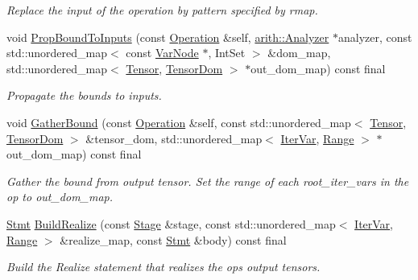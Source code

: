 \begin{DoxyCompactItemize}
\begin{DoxyCompactList}\small\item\em Replace the input of the operation by pattern specified by rmap. \end{DoxyCompactList}\item 
void \hyperlink{classtvm_1_1te_1_1ScanOpNode_a457c2582ccf09454b6c18818297172f7}{Prop\+Bound\+To\+Inputs} (const \hyperlink{classtvm_1_1te_1_1Operation}{Operation} \&self, \hyperlink{classtvm_1_1arith_1_1Analyzer}{arith\+::\+Analyzer} $\ast$analyzer, const std\+::unordered\+\_\+map$<$ const \hyperlink{classtvm_1_1tir_1_1VarNode}{Var\+Node} $\ast$, Int\+Set $>$ \&dom\+\_\+map, std\+::unordered\+\_\+map$<$ \hyperlink{classtvm_1_1te_1_1Tensor}{Tensor}, \hyperlink{structtvm_1_1te_1_1TensorDom}{Tensor\+Dom} $>$ $\ast$out\+\_\+dom\+\_\+map) const final
\begin{DoxyCompactList}\small\item\em Propagate the bounds to inputs. \end{DoxyCompactList}\item 
void \hyperlink{classtvm_1_1te_1_1ScanOpNode_a05f9152abd7511c3a9861a8936cb8e52}{Gather\+Bound} (const \hyperlink{classtvm_1_1te_1_1Operation}{Operation} \&self, const std\+::unordered\+\_\+map$<$ \hyperlink{classtvm_1_1te_1_1Tensor}{Tensor}, \hyperlink{structtvm_1_1te_1_1TensorDom}{Tensor\+Dom} $>$ \&tensor\+\_\+dom, std\+::unordered\+\_\+map$<$ \hyperlink{classtvm_1_1tir_1_1IterVar}{Iter\+Var}, \hyperlink{classtvm_1_1Range}{Range} $>$ $\ast$out\+\_\+dom\+\_\+map) const final
\begin{DoxyCompactList}\small\item\em Gather the bound from output tensor. Set the range of each root\+\_\+iter\+\_\+vars in the op to out\+\_\+dom\+\_\+map. \end{DoxyCompactList}\item 
\hyperlink{classtvm_1_1tir_1_1Stmt}{Stmt} \hyperlink{classtvm_1_1te_1_1ScanOpNode_a6ff44bafcf683b8be553191d6a21ac4c}{Build\+Realize} (const \hyperlink{classtvm_1_1te_1_1Stage}{Stage} \&stage, const std\+::unordered\+\_\+map$<$ \hyperlink{classtvm_1_1tir_1_1IterVar}{Iter\+Var}, \hyperlink{classtvm_1_1Range}{Range} $>$ \&realize\+\_\+map, const \hyperlink{classtvm_1_1tir_1_1Stmt}{Stmt} \&body) const final
\begin{DoxyCompactList}\small\item\em Build the Realize statement that realizes the op\textquotesingle{}s output tensors. \end{DoxyCompactList}\item 

\end{DoxyCompactItemize}
